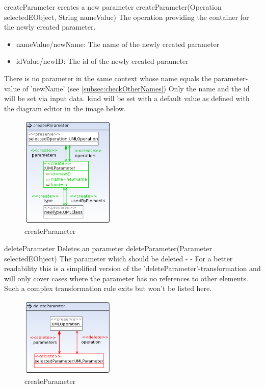 \op
{createParameter}
{creates a new parameter}
{createParameter(Operation selectedEObject, String nameValue)}
{The operation providing the container for the newly created parameter.}
{
\begin{itemize}
 \item nameValue/newName: The name of the newly created parameter
 \item idValue/newID: The id of the newly created parameter
\end{itemize}
}
{There is no parameter in the same context whose name equals the parameter-value
of 'newName' (see
\ref{subsec:checkOtherNames})} 
{Only the name and the id will be set via input data. kind will be set
with a default value as defined with the diagram editor in the image below.}
\begin{figure}[H]
  \centering
  \includegraphics[width=0.4\textwidth]{pics/createParameter.png}
  \caption{createParameter}
  \label{createParameter}
\end{figure}
\op
{deleteParameter}
{Deletes an parameter}
{deleteParameter(Parameter selectedEObject)}
{The parameter which should be deleted}
{-}
{-}
{For a better readability this is a simplified version of the
'deleteParameter'-transformation and will only cover cases where the
parameter has no references to other elements. Such a
complex transformation rule exits but won't be listed here.}
\begin{figure}[H]
  \centering
  \includegraphics[width=0.4\textwidth]{pics/deleteParameter_emptyAndUnreferenced.png}
  \caption{createParameter}
  \label{createParameter}
\end{figure}
